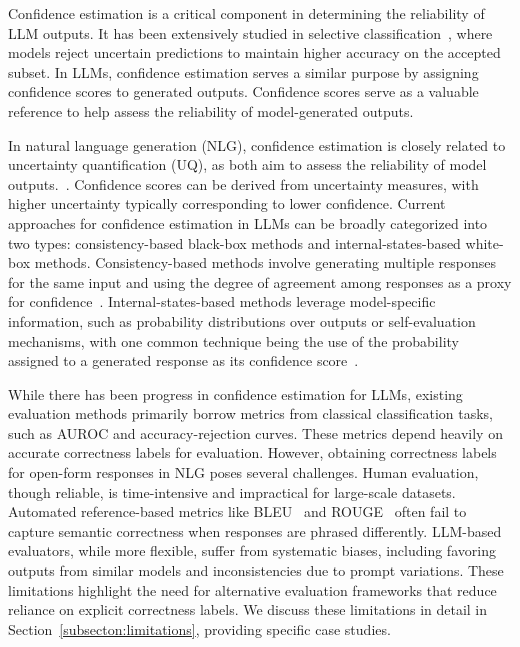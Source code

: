 Confidence estimation is a critical component in determining the reliability of LLM outputs. It has been extensively studied in selective classification~\cite{geifman2017selective}, where models reject uncertain predictions to maintain higher accuracy on the accepted subset. In LLMs, confidence estimation serves a similar purpose by assigning confidence scores to generated outputs. Confidence scores serve as a valuable reference to help assess the reliability of model-generated outputs.

In natural language generation (NLG), confidence estimation is closely related to uncertainty quantification (UQ), as both aim to assess the reliability of model outputs.~\cite{}.  Confidence scores can be derived from uncertainty measures, with higher uncertainty typically corresponding to lower confidence. Current approaches for confidence estimation in LLMs can be broadly categorized into two types: consistency-based black-box methods and internal-states-based white-box methods. Consistency-based methods involve generating multiple responses for the same input and using the degree of agreement among responses as a proxy for confidence~\cite{}. Internal-states-based methods leverage model-specific information, such as probability distributions over outputs or self-evaluation mechanisms, with one common technique being the use of the probability assigned to a generated response as its confidence score~\cite{}.


While there has been progress in confidence estimation for LLMs, existing evaluation methods primarily borrow metrics from classical classification tasks, such as AUROC and accuracy-rejection curves. These metrics depend heavily on accurate correctness labels for evaluation. However, obtaining correctness labels for open-form responses in NLG poses several challenges. Human evaluation, though reliable, is time-intensive and impractical for large-scale datasets. Automated reference-based metrics like BLEU~\cite{} and ROUGE~\cite{} often fail to capture semantic correctness when responses are phrased differently. LLM-based evaluators, while more flexible, suffer from systematic biases, including favoring outputs from similar models and inconsistencies due to prompt variations. These limitations highlight the need for alternative evaluation frameworks that reduce reliance on explicit correctness labels. We discuss these limitations in detail in Section~\ref{subsecton:limitations}, providing specific case studies.

